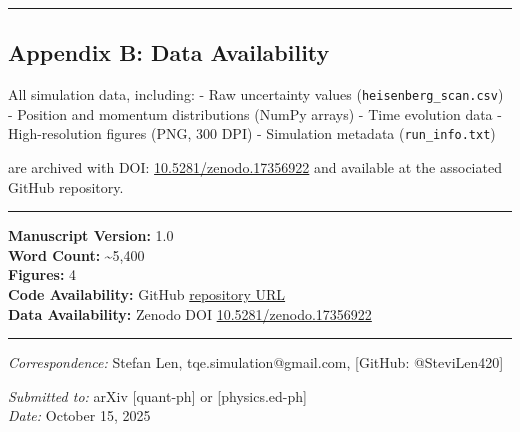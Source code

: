 \documentclass[
]{article}
\begin{document}
\begin{center}\rule{0.5\linewidth}{0.5pt}\end{center}

\subsection{Appendix B: Data
Availability}\label{appendix-b-data-availability}

All simulation data, including: - Raw uncertainty values
(\texttt{heisenberg\_scan.csv}) - Position and momentum distributions
(NumPy arrays) - Time evolution data - High-resolution figures (PNG, 300
DPI) - Simulation metadata (\texttt{run\_info.txt})

are archived with DOI:
\href{https://doi.org/10.5281/zenodo.17356922}{10.5281/zenodo.17356922}
and available at the associated GitHub repository.

\begin{center}\rule{0.5\linewidth}{0.5pt}\end{center}

\textbf{Manuscript Version:} 1.0\\
\textbf{Word Count:} \textasciitilde5,400\\
\textbf{Figures:} 4\\
\textbf{Code Availability:} GitHub
\href{https://github.com/SteviLen420/Heisenberg_Uncertainty_Simulation}{repository
URL}\\
\textbf{Data Availability:} Zenodo DOI
\href{https://doi.org/10.5281/zenodo.17356922}{10.5281/zenodo.17356922}

\begin{center}\rule{0.5\linewidth}{0.5pt}\end{center}

\emph{Correspondence:} Stefan Len, tqe.simulation@gmail.com, {[}GitHub:
@SteviLen420{]}

\emph{Submitted to:} arXiv {[}quant-ph{]} or {[}physics.ed-ph{]}\\
\emph{Date:} October 15, 2025
\end{document}
